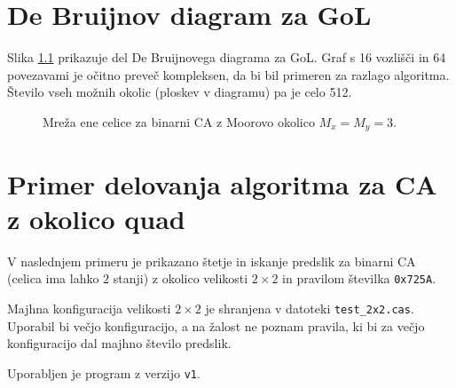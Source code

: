 \documentclass[12pt,a4paper,openany,twoside]{book}
\begin{document}

\appendix

\chapter{De Bruijnov diagram za GoL}

Slika \ref{network_single_moore} prikazuje del De Bruijnovega diagrama za GoL.
Graf s 16 vozlišči in 64 povezavami je očitno preveč kompleksen, da bi bil primeren za razlago algoritma.
Število vseh možnih okolic (ploskev v diagramu) pa je celo 512.

\begin{figure}[htb]
\centerline{}
\caption[Mreža ene celice za GoL.]{Mreža ene celice za binarni CA z Moorovo okolico \(M_x=M_y=3\).}
\label{network_single_moore}
\end{figure}

\chapter{Primer delovanja algoritma za CA z okolico quad}

V naslednjem primeru je prikazano štetje in iskanje predslik
za binarni CA (celica ima lahko \(2\) stanji) z okolico velikosti \(2 \times 2\)
in pravilom številka \verb|0x725A|.

Majhna konfiguracija velikosti \(2 \times 2\) je shranjena v datoteki \verb|test_2x2.cas|.
Uporabil bi večjo konfiguracijo, a na žalost ne poznam pravila,
ki bi za večjo konfiguracijo dal majhno število predslik.

Uporabljen je program \cite{Jeras2016-algirithm} z verzijo \verb|v1|.
\end{document}
